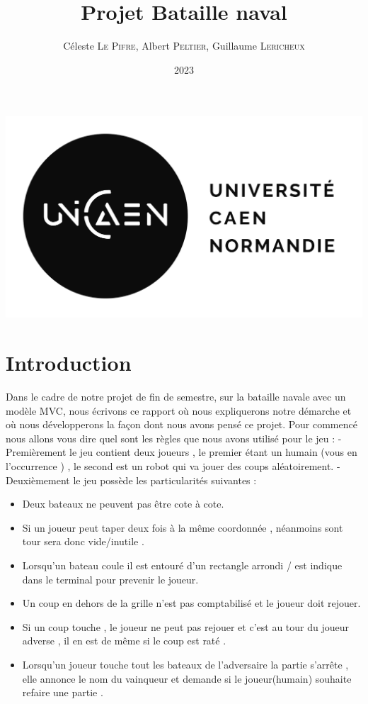 \documentclass[a4paper,12pt]{article} %
\begin{document}
\renewcommand{\contentsname}{Sommaire}
\title{Projet Bataille naval}
\author{Céleste \textsc{Le Pifre}, Albert \textsc{Peltier}, Guillaume \textsc{Lericheux}}
\date{2023}
\maketitle
\begin{center}
\includegraphics[scale=0.5]{UNICAEN.png}
\end{center}
\section{Introduction}
Dans le cadre de notre projet de fin de semestre, sur la bataille navale avec un modèle MVC, nous écrivons ce rapport où nous expliquerons notre démarche et où nous développerons la façon dont nous avons pensé ce projet. Pour commencé nous allons vous dire quel sont les règles que nous avons utilisé pour le jeu : 
- Premièrement le jeu contient deux joueurs , le premier étant un humain (vous en l'occurrence ) , le second est un robot qui va jouer des coups aléatoirement.
- Deuxièmement le jeu possède les particularités suivantes :
\begin{itemize}
\item Deux bateaux ne peuvent pas être cote à cote.
\item Si un joueur peut taper deux fois à la même coordonnée , néanmoins sont tour sera donc vide/inutile .
\item Lorsqu'un bateau coule il est entouré d'un rectangle arrondi / est indique dans le terminal pour prevenir le joueur.
\item Un coup en dehors de la grille n'est pas comptabilisé et le joueur doit rejouer.
\item Si un coup touche , le joueur ne peut pas rejouer et c'est au tour du joueur adverse , il en est de même si le coup est raté .
\item Lorsqu'un joueur touche tout les bateaux de l'adversaire la partie s'arrête , elle annonce le nom du vainqueur et demande si le joueur(humain) souhaite refaire une partie .
\end{itemize}
\newpage
\tableofcontents
\end{document}
